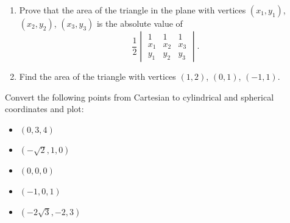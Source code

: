 \documentclass[openany]{book}
\begin{document}
\begin{prob}[27]
    \begin{enumerate}
        \item[(a)] Prove that the area of the triangle in the plane with vertices \((x_1, y_1)\), \((x_2, y_2)\), \((x_3, y_3)\) is the absolute value of  
        \[
            \frac{1}{2} \begin{vmatrix}
            1 & 1 & 1 \\
            x_1 & x_2 & x_3 \\
            y_1 & y_2 & y_3
            \end{vmatrix}.
        \]
        \item[(b)] Find the area of the triangle with vertices \((1, 2)\), \((0, 1)\), \((-1, 1)\).
    \end{enumerate}
\end{prob}


\begin{prob}[28]
    Convert the following points from Cartesian to cylindrical and spherical coordinates and plot:  

    \begin{itemize}
        \item[(a)] \((0, 3, 4)\)
        \item[(b)] \((-\sqrt{2}, 1, 0)\)
        \item[(c)] \((0, 0, 0)\)
        \item[(d)] \((-1, 0, 1)\)
        \item[(e)] \((-2\sqrt{3}, -2, 3)\)
    \end{itemize}
\end{prob}
\end{document}
